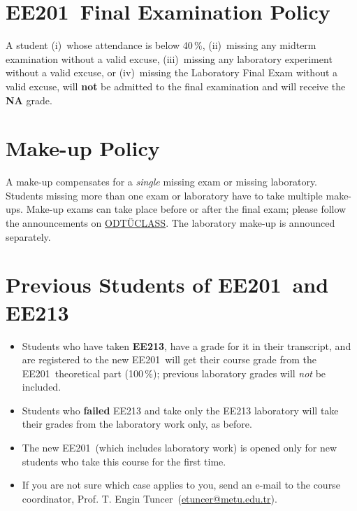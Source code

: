 \documentclass[10pt,a4paper]{article}
\makeatletter
\newcommand{\coursecode}{EE201}
\newcommand{\odtuclass}{https://odtuclass.metu.edu.tr}
\newcommand{\coordinator}{Prof. T. Engin Tuncer}
\newcommand{\coordinatormail}{etuncer@metu.edu.tr}
\makeatother
\begin{document}
\section{\coursecode\ Final Examination Policy}

A student (i)~whose attendance is below 40\,\%, (ii)~missing any midterm examination without a
valid excuse, (iii)~missing any laboratory experiment without a valid excuse, or (iv)~missing the
Laboratory Final Exam without a valid excuse, will \textbf{not} be admitted to the final
examination and will receive the \textbf{NA} grade.

\section{Make-up Policy}

A make-up compensates for a \emph{single} missing exam or missing laboratory. Students missing
more than one exam or laboratory have to take multiple make-ups. Make-up exams can take place
before or after the final exam; please follow the announcements on \href{\odtuclass}{ODTÜCLASS}.
The laboratory make-up is announced separately.

\section{Previous Students of \coursecode\ and EE213}

\begin{itemize}
  \item Students who have taken \textbf{EE213}, have a grade for it in their transcript, and are
        registered to the new \coursecode\ will get their course grade from the \coursecode\
        theoretical part (100\,\%); previous laboratory grades will \emph{not} be included.
  \item Students who \textbf{failed} EE213 and take only the EE213 laboratory will take their
        grades from the laboratory work only, as before.
  \item The new \coursecode\ (which includes laboratory work) is opened only for new students
        who take this course for the first time.
  \item If you are not sure which case applies to you, send an e-mail to the course coordinator,
        \coordinator\ (\href{mailto:\coordinatormail}{\coordinatormail}).
\end{itemize}
\end{document}
